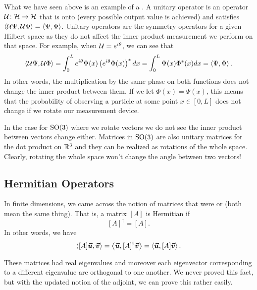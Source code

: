 What we have seen above is an example of a .  A unitary operator is an operator $\mathcal{U}\colon \mathcal{H} \to \mathcal{H}$ that is onto (every possible output value is achieved) and satisfies $\left\langle \mathcal{U}\Psi, \mathcal{U}\Phi \right\rangle=\left\langle \Psi, \Phi \right\rangle$.  Unitary operators are the symmetry operators for a given Hilbert space as they do not affect the inner product measurement we perform on that space.  For example, when $\mathcal{U}=e^{i\theta}$, we can see that
\[
\left\langle \mathcal{U}\Psi, \mathcal{U}\Phi \right\rangle = \int_0^L e^{i\theta}\Psi(x) \left(e^{i\theta} \Phi(x)\right)^*dx = \int_0^L \Psi(x)\Phi^*(x)dx = \left\langle \Psi, \Phi \right\rangle.
\]
In other words, the multiplication by the same phase on both functions does not change the inner product between them. If we let $\Phi(x)=\Psi(x)$, this means that the probability of observing a particle at some point $x\in [0,L]$ does not change if we rotate our measurement device.  

In the case for $\mathrm{SO}(3)$ where we rotate vectors we do not see the inner product between vectors change either.  Matrices in $\mathrm{SO}(3)$ are also unitary matrices for the dot product on $\mathbb{R}^3$ and they can be realized as rotations of the whole space.  Clearly, rotating the whole space won't change the angle between two vectors!



\subsection{Hermitian Operators}
In finite dimensions, we came across the notion of matrices that were  or  (both mean the same thing).  That is, a matrix $[A]$ is Hermitian if
\[
[A]^\dagger = [A].
\]
In other words, we have
\[
\left\langle [A]\boldsymbol{\boldsymbol{\vec{u}}}, \boldsymbol{\boldsymbol{\vec{v}}} \right\rangle = \left\langle \boldsymbol{\boldsymbol{\vec{u}}}, [A]^\dagger \boldsymbol{\boldsymbol{\vec{v}}} \right\rangle=\left\langle \boldsymbol{\boldsymbol{\vec{u}}}, [A]\boldsymbol{\boldsymbol{\vec{v}}} \right\rangle.
\]

These matrices had real eigenvalues and moreover each eigenvector corresponding to a different eigenvalue are orthogonal to one another. We never proved this fact, but with the updated notion of the adjoint, we can prove this rather easily.

